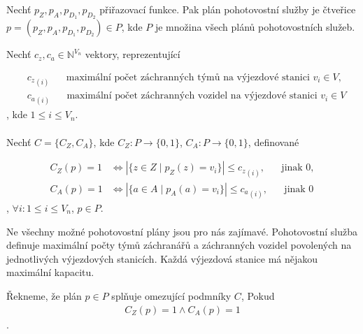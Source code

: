 \begin{definice}
  Nechť $p_Z, p_A, p_{D_{1}}, p_{D_{2}}$ přiřazovací funkce.
  Pak plán pohotovostní služby je čtveřice $p = (p_Z, p_A, p_{D_{1}}, p_{D_{2}}) \in P$, kde $P$ je množina všech plánů pohotovostních služeb.
  \\
\end{definice}

\begin{definice}
  Nechť $c_z, c_a \in \mathbb{N}^{V_n}$ vektory, reprezentující

  \begin{align}
    &{c_z}_{(i)} \hspace{20pt} \text{maximální počet záchranných týmů na výjezdové stanici $v_i \in V$}, \\ 
    &{c_a}_{(i)} \hspace{20pt} \text{maximální počet záchranných vozidel na výjezdové stanici $v_i \in V$}
  \end{align}
  , kde $1 \leq i \leq V_n$.
  \\
  \\
  Nechť $C = \{ C_Z, C_A \}$, kde $C_Z \colon P \rightarrow \{ 0, 1 \}$, $C_A \colon P \rightarrow \{ 0, 1 \}$, definované

  \begin{align}
    C_Z(p) = 1 &\iff |\{ z \in Z \mid p_Z(z) = v_i \}| \leq {c_z}_{(i)}, \hspace{20pt} \text{jinak 0}, \\
    C_A(p) = 1 &\iff |\{ a \in A \mid p_A(a) = v_i \}| \leq {c_a}_{(i)}, \hspace{20pt} \text{jinak 0}
  \end{align}
  , $\forall i \colon 1 \leq i \leq V_n$, $p \in P$.
  \\
\end{definice}

Ne všechny možné pohotovostní plány jsou pro nás zajímavé.
Pohotovostní služba definuje maximální počty týmů záchranářů a záchranných vozidel povolených na jednotlivých výjezdových stanicích.
Každá výjezdová stanice má nějakou maximální kapacitu.

\begin{definice}
  Řekneme, že plán $p \in P$ splňuje omezující podmníky $C$, Pokud
  \begin{align}
    C_Z(p) = 1 \land C_A(p) = 1
  \end{align}
  .
\end{definice}

